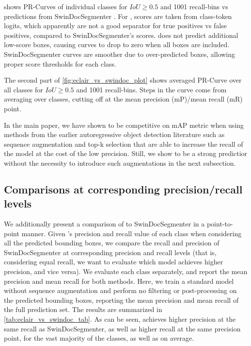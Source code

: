  shows PR-Curves of individual classes for $IoU \geq 0.5$ and 1001 recall-bins vs predictions from SwinDocSegmenter \cite{swindocsegmenter}. For \eclair, scores are taken from class-token logits, which apparently are not a good separator for true positives vs false positives, compared to SwinDocSegmenter's scores. \eclair does not predict additional low-score boxes, causing curves to drop to zero when all boxes are included. SwinDocSegmenter curves are smoother due to over-predicted boxes, allowing proper score thresholds for each class.

The second part of \cref{fig:eclair_vs_swindoc_plot} shows averaged PR-Curve over all classes for $IoU \geq 0.5$ and 1001 recall-bins. Steps in the \eclair curve come from averaging over classes, cutting off at the mean precision (mP)/mean recall (mR) point. 

In the main paper, we have shown \eclair to be competitive on mAP metric when using methods from the earlier autoregressive object detection literature \cite{pix2seq} such as sequence augmentation and top-k selection that are able to increase the recall of the model at the cost of the low precision. Still, we show \eclair to be a strong predictior without the necessity to introduce such augmentations in the next subsection.

\subsection{Comparisons at corresponding precision/recall levels}
We additionally present a comparison of \eclair to SwinDocSegmenter in a point-to-point manner. Given \eclair's precision and recall value of each class when considering all the predicted bounding boxes, we compare the recall and precision of SwinDocSegmenter at corresponding precision and recall levels (that is, considering equal recall, we want to evaluate which model achieves higher precision, and vice versa). We evaluate each class separately, and report the mean precision and mean recall for both methods. Here, we train a standard \eclair model without sequence augmentation and perform no filtering or post-processing on the predicted bounding boxes, reporting the mean precision and mean recall of the full prediction set. The results are summarized in \cref{tab:eclair_vs_swindoc_tab}. As can be seen, \eclair achieves higher precision at the same recall as SwinDocSegmenter, as well as higher recall at the same precision point, for the vast majority of the classes, as well as on average. 

